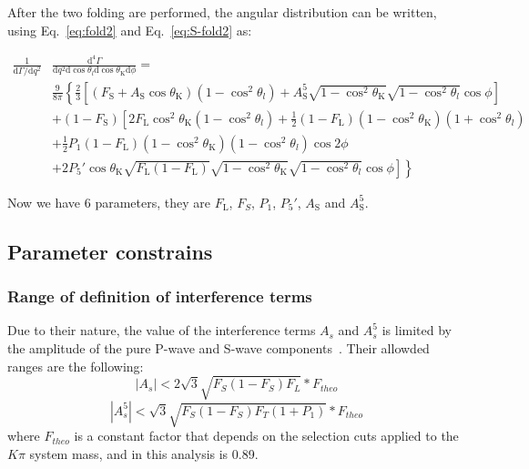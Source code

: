 After the two folding are performed, the angular distribution can be
written, using  Eq.~\ref{eq:fold2} and Eq.~\ref{eq:S-fold2} as:

\begin{equation} \label{eq:PDF-f2}
  \begin{split}
    \frac{1}{\mathrm{d}\Gamma/\mathrm{d}q^2}&\frac{\mathrm{d}^4\Gamma}{\mathrm{d}q^2 \mathrm{d}\cos\theta_l \mathrm{d}\cos\theta_\mathrm{K} \mathrm{d}\phi} = \\
    &\frac{9}{8\pi}\left\{\frac{2}{3}\left[ (F_\mathrm{S}+A_\mathrm{S}\cos\theta_\mathrm{K})\left(1-\cos^2\theta_l\right) + A^5_\mathrm{S}\sqrt{1-\cos^2\theta_\mathrm{K}}\sqrt{1-\cos^2\theta_l}\cos\phi \right] \right.\\
    & + \left(1 - F_\mathrm{S}\right)\left[2F_\mathrm{L}\cos^2\theta_\mathrm{K}\left(1-\cos^2\theta_l\right)+\frac{1}{2}\left(1-F_\mathrm{L}\right)\left(1-\cos^2\theta_\mathrm{K}\right)\left(1+\cos^2\theta_l\right) \right.\\
      & + \frac{1}{2}P_1(1-F_\mathrm{L})(1-\cos^2\theta_\mathrm{K})(1-\cos^2\theta_l)\cos 2\phi \\
      & \left.\left. + 2P_5'\cos\theta_\mathrm{K}\sqrt{F_\mathrm{L}\left(1-F_\mathrm{L}\right)}\sqrt{1-\cos^2\theta_\mathrm{K}}\sqrt{1-\cos^2\theta_l}\cos\phi\right]\right\}
  \end{split}
\end{equation}

Now we have 6 parameters, they are $F_\mathrm{L}$, $F_S$, $P_1$, $P_5'$, $A_\mathrm{S}$
and $A^5_\mathrm{S}$.

\subsection{Parameter constrains}
\label{sec:bound}

\subsubsection{Range of definition of interference terms}
\label{sec:As5.range}
Due to their nature, the value of the interference terms $A_s$ and $A_s^5$ is limited by the amplitude of the pure P-wave and S-wave components~\cite{Genon:Swave}. Their allowded ranges are the following:
\begin{equation} \label{eq:As.range}
  |A_s|<2\sqrt{3}\sqrt{F_S(1-F_S)F_L}*F_{theo}
\end{equation}
\begin{equation} \label{eq:As5.range}
  |A^5_s|<\sqrt{3}\sqrt{F_S(1-F_S)F_T(1+P_1)}*F_{theo}
\end{equation}
where $F_{theo}$ is a constant factor that depends on the selection cuts applied to the $K\pi$ system mass, and in this analysis is 0.89.

